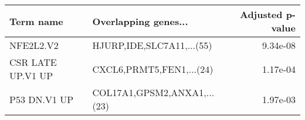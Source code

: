 \begin{tabular}{llr}
\toprule
        Term name &        Overlapping genes... &  Adjusted p-value \\
\midrule
        NFE2L2.V2 &   HJURP,IDE,SLC7A11,...(55) &          9.34e-08 \\
CSR LATE UP.V1 UP &    CXCL6,PRMT5,FEN1,...(24) &          1.17e-04 \\
     P53 DN.V1 UP & COL17A1,GPSM2,ANXA1,...(23) &          1.97e-03 \\
\bottomrule
\end{tabular}
